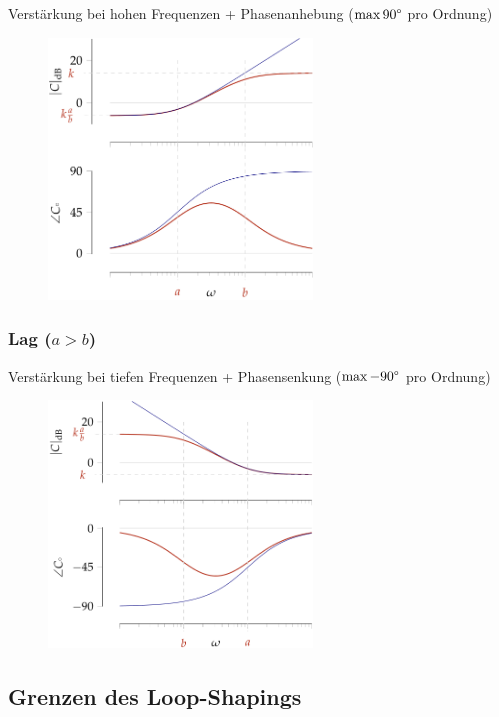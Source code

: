 \documentclass[
  10pt,
  a4paper,
  twocolumn]{article}
\numberwithin{equation}{section}
\begin{document}
Verstärkung bei hohen Frequenzen + Phasenanhebung (\(\max 90\degree\)
pro Ordnung)

\begin{figure}[H]

{\centering \includegraphics[width=7cm,height=\textheight]{images/paste-40.png}

}

\end{figure}

\hypertarget{lag-a-b}{%
\subsubsection{\texorpdfstring{Lag
(\(a > b\))}{Lag (a \textgreater{} b)}}\label{lag-a-b}}

Verstärkung bei tiefen Frequenzen + Phasensenkung (\(\max -90\degree\)
pro Ordnung)

\begin{figure}[H]

{\centering \includegraphics[width=7cm,height=\textheight]{images/paste-41.png}

}

\end{figure}

\hypertarget{grenzen-des-loop-shapings}{%
\subsection{Grenzen des Loop-Shapings}\label{grenzen-des-loop-shapings}}
\end{document}
